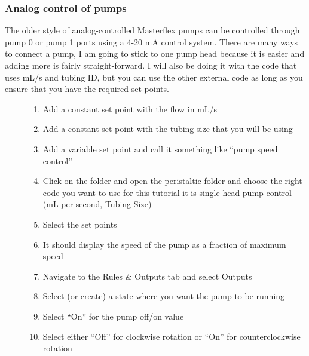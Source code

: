 \documentclass[letterpaper,10pt,english]{sphinxmanual}
\begin{document}
\subsubsection{Analog control of pumps}
\label{\detokenize{ProCoDA/ProCoDA:analog-control-of-pumps}}\begin{description}
\item[{The older style of analog-controlled Masterflex pumps can be controlled through pump 0 or pump 1 ports using a 4-20 mA control system. There are many ways to connect a pump, I am going to stick to one pump head because it is easier and adding more is fairly straight-forward. I will also be doing it with the code that uses mL/s and tubing ID, but you can use the other external code as long as you ensure that you have the required set points.}] \leavevmode\begin{enumerate}
\item {} 
Add a constant set point with the flow in mL/s 

\item {} 
Add a constant set point with the tubing size that you will be using 

\item {} 
Add a variable set point and call it something like “pump speed control” 

\item {} 
Click on the folder and open the peristaltic folder and choose the right code you want to use for this tutorial it is single head pump control (mL per second, Tubing Size)

\item {} 
Select the set points

\item {} 
It should display the speed of the pump as a fraction of maximum speed

\item {} 
Navigate to the Rules \& Outputs tab and select Outputs 

\item {} 
Select (or create) a state where you want the pump to be running

\item {} 
Select “On” for the pump off/on value

\item {} 
Select either “Off” for clockwise rotation or “On” for counterclockwise rotation


\end{enumerate}
\end{description}
\end{document}
